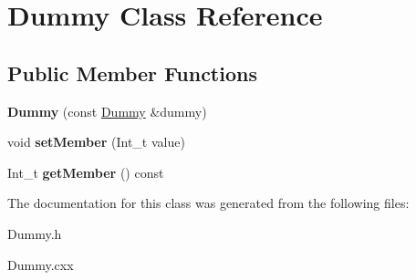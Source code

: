 \hypertarget{classDummy}{}\section{Dummy Class Reference}
\label{classDummy}
\subsection*{Public Member Functions}
\begin{DoxyCompactItemize}
\item 
\mbox{\label{classDummy_aaed3afdeb98915dd70a81f2d78c65f54}} 
{\bfseries Dummy} (const \hyperlink{classDummy}{Dummy} \&dummy)
\item 
\mbox{\label{classDummy_aaad1dd5a6eaa48f6a475c361713b9b96}} 
void {\bfseries set\+Member} (Int\+\_\+t value)
\item 
\mbox{\label{classDummy_adfc4d409a0c41d424fc0ea0248930a27}} 
Int\+\_\+t {\bfseries get\+Member} () const
\end{DoxyCompactItemize}


The documentation for this class was generated from the following files\+:\begin{DoxyCompactItemize}
\item 
Dummy.\+h\item 
Dummy.\+cxx\end{DoxyCompactItemize}
